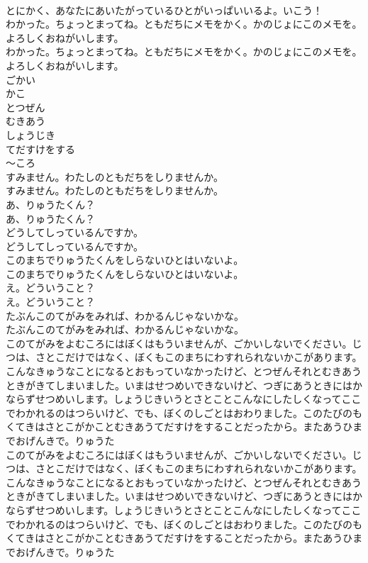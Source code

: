\documentclass[8pt]{extreport}
\begin{document}
\begin{CJK}{UTF8}{min}
\\	とにかく、あなたにあいたがっているひとがいっぱいいるよ。いこう！ 
\\	わかった。ちょっとまってね。ともだちにメモをかく。かのじょにこのメモを。よろしくおねがいします。	
\\	わかった。ちょっとまってね。ともだちにメモをかく。かのじょにこのメモを。よろしくおねがいします。 
\\	ごかい
\\	かこ
\\	とつぜん
\\	むきあう
\\	しょうじき
\\	てだすけをする
\\	〜ころ
\\	すみません。わたしのともだちをしりませんか。	
\\	すみません。わたしのともだちをしりませんか。 
\\	あ、りゅうたくん？	
\\	あ、りゅうたくん？ 
\\	どうしてしっているんですか。	
\\	どうしてしっているんですか。 
\\	このまちでりゅうたくんをしらないひとはいないよ。	
\\	このまちでりゅうたくんをしらないひとはいないよ。 
\\	え。どういうこと？	
\\	え。どういうこと？ 
\\	たぶんこのてがみをみれば、わかるんじゃないかな。	
\\	たぶんこのてがみをみれば、わかるんじゃないかな。 
\\	このてがみをよむころにはぼくはもういませんが、ごかいしないでください。じつは、さとこだけではなく、ぼくもこのまちにわすれられないかこがあります。こんなきゅうなことになるとおもっていなかったけど、とつぜんそれとむきあうときがきてしまいました。いまはせつめいできないけど、つぎにあうときにはかならずせつめいします。しょうじきいうとさとことこんなにしたしくなってここでわかれるのはつらいけど、でも、ぼくのしごとはおわりました。このたびのもくてきはさとこがかことむきあうてだすけをすることだったから。またあうひまでおげんきで。りゅうた	
\\	このてがみをよむころにはぼくはもういませんが、ごかいしないでください。じつは、さとこだけではなく、ぼくもこのまちにわすれられないかこがあります。こんなきゅうなことになるとおもっていなかったけど、とつぜんそれとむきあうときがきてしまいました。いまはせつめいできないけど、つぎにあうときにはかならずせつめいします。しょうじきいうとさとことこんなにしたしくなってここでわかれるのはつらいけど、でも、ぼくのしごとはおわりました。このたびのもくてきはさとこがかことむきあうてだすけをすることだったから。またあうひまでおげんきで。りゅうた 

\end{CJK}
\end{document}

